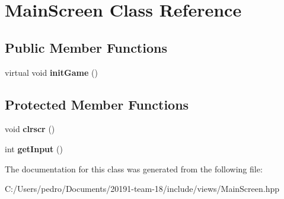 \hypertarget{class_main_screen}{}\section{Main\+Screen Class Reference}
\label{class_main_screen}
\subsection*{Public Member Functions}
\begin{DoxyCompactItemize}
\item 
\mbox{\label{class_main_screen_a26e54b5922d5ffec7483309a14d0f55a}} 
virtual void {\bfseries init\+Game} ()
\end{DoxyCompactItemize}
\subsection*{Protected Member Functions}
\begin{DoxyCompactItemize}
\item 
\mbox{\label{class_main_screen_ac3fa0644a44436d74b96c68064edbcb4}} 
void {\bfseries clrscr} ()
\item 
\mbox{\label{class_main_screen_a1e7fe1c7f36c10ad20f518dab8c47196}} 
int {\bfseries get\+Input} ()
\end{DoxyCompactItemize}


The documentation for this class was generated from the following file\+:\begin{DoxyCompactItemize}
\item 
C\+:/\+Users/pedro/\+Documents/20191-\/team-\/18/include/views/Main\+Screen.\+hpp\end{DoxyCompactItemize}
